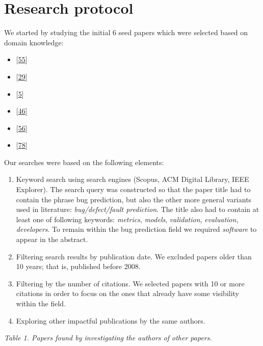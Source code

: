 \documentclass[]{book}
\providecommand{\tightlist}{%
  \setlength{\itemsep}{0pt}\setlength{\parskip}{0pt}}
\begin{document}
\section{Research protocol}\label{research-protocol-1}

We started by studying the initial 6 seed papers which were selected
based on domain knowledge:

\begin{itemize}
\tightlist
\item
  {[}\protect\hyperlink{ref-Gyimothy2005}{55}{]}
\item
  {[}\protect\hyperlink{ref-Catal2009review}{29}{]}
\item
  {[}\protect\hyperlink{ref-Arisholm2010}{5}{]}
\item
  {[}\protect\hyperlink{ref-DAmbros2010}{46}{]}
\item
  {[}\protect\hyperlink{ref-Hall2012}{56}{]}
\item
  {[}\protect\hyperlink{ref-Lewis2013}{78}{]}
\end{itemize}

Our searches were based on the following elements:

\begin{enumerate}
\def\labelenumi{\arabic{enumi}.}
\item
  Keyword search using search engines (Scopus, ACM Digital Library, IEEE
  Explorer). The search query was constructed so that the paper title
  had to contain the phrase bug prediction, but also the other more
  general variants used in literature: \emph{bug/defect/fault
  prediction}. The title also had to contain at least one of following
  keywords: \emph{metrics}, \emph{models}, \emph{validation},
  \emph{evaluation}, \emph{developers}. To remain within the bug
  prediction field we required \emph{software} to appear in the
  abstract.
\item
  Filtering search results by publication date. We excluded papers older
  than 10 years; that is, published before 2008.
\item
  Filtering by the number of citations. We selected papers with 10 or
  more citations in order to focus on the ones that already have some
  visibility within the field.
\item
  Exploring other impactful publications by the same authors.
\end{enumerate}

\emph{Table 1. Papers found by investigating the authors of other
papers.}
\end{document}
